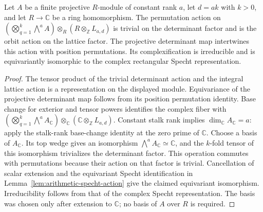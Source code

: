 \begin{lemma}
\label{lem:determinant-specht-representation}
\leanok
Let $A$ be a finite projective $R$-module of constant rank $a$, let
$d=ak$ with $k>0$, and let $R\to\mathbb C$ be a ring homomorphism.
The permutation action on
$(\bigotimes_{q=1}^k\bigwedge^a A)\otimes_R(R\otimes_{\mathbb Z}L_{a,d})$
is trivial on the determinant factor and is the orbit action on the lattice
factor. The projective determinant map intertwines this action with
position permutations. Its complexification is irreducible and is
equivariantly isomorphic to the complex rectangular Specht representation.
\end{lemma}
\begin{proof}
The tensor product of the trivial determinant action and the integral
lattice action is a representation on the displayed module. Equivariance
of the projective determinant map follows from its position
permutation identity. Base change for exterior and
tensor powers identifies the complex fiber with
$(\bigotimes_{q=1}^k\bigwedge^a A_{\mathbb C})\otimes_{\mathbb C}
(\mathbb C\otimes_{\mathbb Z}L_{a,d})$.
Constant stalk rank implies $\dim_{\mathbb C}A_{\mathbb C}=a$:
apply the stalk-rank base-change identity at the zero prime of
$\mathbb C$. Choose a basis of $A_{\mathbb C}$. Its top wedge gives
an isomorphism $\bigwedge^a A_{\mathbb C}\simeq\mathbb C$, and the
$k$-fold tensor of this isomorphism trivializes the determinant factor.
This operation commutes with permutations because their action on that
factor is trivial. Cancellation of scalar extension and the equivariant
Specht identification in Lemma~\ref{lem:arithmetic-specht-action} give the
claimed equivariant isomorphism. Irreducibility follows from that of the
complex Specht representation. The basis was chosen only after extension
to $\mathbb C$; no basis of $A$ over $R$ is required.
\end{proof}

